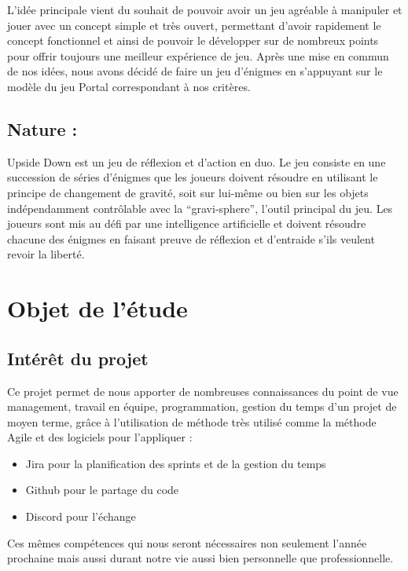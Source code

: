 \documentclass[a4paper,11pt]{article}
\begin{document}
	L’idée principale vient du souhait de pouvoir avoir un jeu agréable à manipuler 
    et jouer avec un concept simple et très ouvert, permettant d’avoir rapidement le concept fonctionnel et ainsi de pouvoir le développer sur de nombreux points pour offrir toujours une meilleur expérience de jeu. Après une mise en commun de nos idées, nous avons décidé de faire un jeu d’énigmes en s’appuyant sur le modèle du jeu Portal correspondant à nos critères.	

    \subsection{Nature :}
	Upside Down est un jeu de réflexion et d'action en duo.
Le jeu consiste en une succession de séries d'énigmes que les joueurs doivent 
résoudre en utilisant le principe de changement de gravité, soit sur lui-même ou bien sur les objets indépendamment contrôlable avec la “gravi-sphere”, l’outil principal du jeu. Les joueurs sont mis au défi par une intelligence artificielle et doivent résoudre chacune des énigmes en faisant preuve de réflexion et d'entraide s'ils veulent revoir la liberté.

\section{Objet de l’étude}

\subsection{Intérêt du projet}
Ce projet permet de nous apporter de nombreuses connaissances du point de vue management, 
travail en équipe, programmation, gestion du temps d’un projet de moyen terme, 
grâce à l’utilisation de méthode très utilisé comme la méthode Agile et des logiciels pour l’appliquer : \newline

\begin{itemize}
    \item Jira pour la planification des sprints et de la gestion du temps
    \item Github pour le partage du code
    \item Discord pour l’échange
\end{itemize}

\break

Ces mêmes compétences qui nous seront nécessaires non seulement 
l’année prochaine mais aussi durant notre vie aussi bien personnelle que professionnelle.
\end{document}
